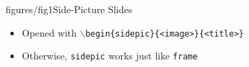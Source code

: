 \begin{sidepic}{figures/fig1}{Side-Picture Slides}
    \begin{itemize}
        \item Opened with \texttt{$\backslash$begin\{sidepic\}\{<image>\}\{<title>\}}
        \item Otherwise, \texttt{sidepic} works just like \texttt{frame}
    \end{itemize}
\end{sidepic}